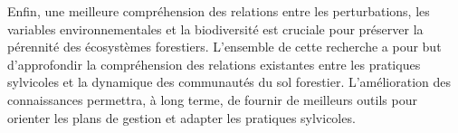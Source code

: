 Enfin, une meilleure compréhension des relations entre les perturbations, les variables environnementales et la biodiversité est cruciale pour préserver la pérennité des écosystèmes forestiers. 
L'ensemble de cette recherche a pour but d'approfondir la compréhension des relations existantes entre les pratiques sylvicoles et la dynamique des communautés du sol forestier. 
L'amélioration des connaissances permettra, à long terme, de fournir de meilleurs outils pour orienter les plans de gestion et adapter les pratiques sylvicoles.


\cleardoublepage


